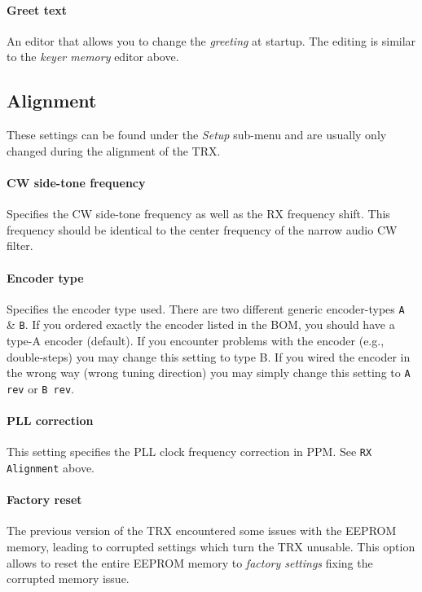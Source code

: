 \documentclass[10pt, a4paper]{scrartcl}
\begin{document}
\paragraph{Greet text}
An editor that allows you to change the \emph{greeting} at startup. The editing is similar to the \emph{keyer memory} editor above.


\subsection{Alignment}
These settings can be found under the \emph{Setup} sub-menu and are usually only changed during the alignment of the TRX. 

\paragraph{CW side-tone frequency}
Specifies the CW side-tone frequency as well as the RX frequency shift. This frequency should be identical to the center frequency of the narrow audio CW filter.

\paragraph{Encoder type}
Specifies the encoder type used. There are two different generic encoder-types \texttt{A} \& \texttt{B}. If you ordered exactly the encoder listed in the BOM, you should have a type-A encoder (default). If you encounter problems with the encoder (e.g., double-steps) you may change this setting to type B. If you wired the encoder in the wrong way (wrong tuning direction) you may simply change this setting to \texttt{A rev} or \texttt{B rev}. 

\paragraph{PLL correction}
This setting specifies the PLL clock frequency correction in PPM. See \texttt{RX Alignment} above.

\paragraph{Factory reset}
The previous version of the TRX encountered some issues with the EEPROM memory, leading to corrupted settings which turn the TRX unusable. This option allows to reset the entire EEPROM memory to \emph{factory settings} fixing the corrupted memory issue.
\end{document}
